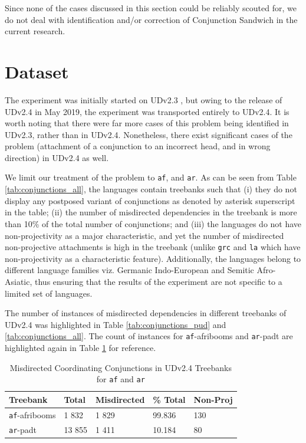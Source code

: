 Since none of the cases discussed in this section could be reliably scouted for, we do not deal with identification and/or correction of Conjunction Sandwich in the current research.

\section{Dataset}
\label{ssec:conj_head_dataset}

The experiment was initially started on UDv2.3 \citep{UDv2.3}, but owing to the release of UDv2.4 \citep{UDv2.4} in May 2019, the experiment was transported entirely to UDv2.4. It is worth noting that there were far more cases of this problem being identified in UDv2.3, rather than in UDv2.4. Nonetheless, there exist significant cases of the problem (attachment of a conjunction to an incorrect head, and in wrong direction) in UDv2.4 as well.

We limit our treatment of the problem to \verb|af|, and \verb|ar|. As can be seen from Table \ref{tab:conjunctions_all}, the languages contain treebanks such that (i) they do not display any postposed variant of conjunctions as denoted by asterisk superscript in the table; (ii) the number of misdirected dependencies in the treebank is more than 10\% of the total number of conjunctions; and (iii) the languages do not have non-projectivity as a major characteristic, and yet the number of misdirected non-projective attachments is high in the treebank (unlike \verb|grc| and \verb|la| which have non-projectivity as a characteristic feature). Additionally, the languages belong to different language families viz. Germanic Indo-European and Semitic Afro-Asiatic, thus ensuring that the results of the experiment are not specific to a limited set of languages.

The number of instances of misdirected dependencies in different treebanks of UDv2.4 was highlighted in Table \ref{tab:conjunctions_pud} and \ref{tab:conjunctions_all}. The count of instances for \verb|af|-afribooms and \verb|ar|-padt are highlighted again in Table \ref{tab:dataset_conj} for reference.

\begin{table}[H]
    \centering
    \begin{tabular}{|l|l|l|l|l|}
        \hline
        \textbf{Treebank} & \textbf{Total} & \textbf{Misdirected} & \textbf{\% Total} & \textbf{Non-Proj}\\
        \hline
        \verb|af|-afribooms & 1 832 & 1 829 & 99.836 & 130\\
        \verb|ar|-padt & 13 855 & 1 411 & 10.184 & 80\\
        \hline
    \end{tabular}
    \caption{Misdirected Coordinating Conjunctions in UDv2.4 Treebanks for \texttt{af} and \texttt{ar}}
    \label{tab:dataset_conj}
\end{table}

